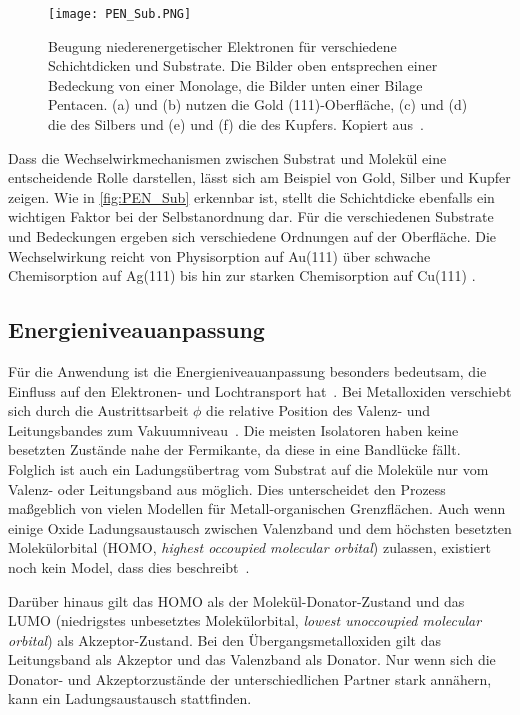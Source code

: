             \begin{figure}
                \centering
                \texttt{[image: PEN\_Sub.PNG]}
                \caption{Beugung niederenergetischer Elektronen für verschiedene Schichtdicken und Substrate.
                Die Bilder oben entsprechen einer Bedeckung von einer Monolage, die Bilder unten einer Bilage Pentacen.
                (a) und (b) nutzen die Gold (111)-Oberfläche, (c) und (d) die des Silbers und (e) und (f) die des Kupfers.
                Kopiert aus~\cite{5A_4}.}
                \label{fig:PEN_Sub}
            \end{figure}
            Dass die Wechselwirkmechanismen zwischen Substrat und Molekül eine entscheidende Rolle darstellen, lässt sich am Beispiel von Gold, Silber und Kupfer zeigen.
            Wie in \autoref{fig:PEN_Sub} erkennbar ist, stellt die Schichtdicke ebenfalls ein wichtigen Faktor bei der Selbstanordnung dar.
            Für die verschiedenen Substrate und Bedeckungen ergeben sich verschiedene Ordnungen auf der Oberfläche.
            Die Wechselwirkung reicht von Physisorption auf Au(111) über schwache Chemisorption auf Ag(111) bis hin zur starken Chemisorption auf Cu(111) \cite{5A_4}.

        \subsection{Energieniveauanpassung} \label{sec:ENA}
            Für die Anwendung ist die Energieniveauanpassung besonders bedeutsam, die Einfluss auf den Elektronen- und Lochtransport hat~\cite{IF_4}.
            Bei Metalloxiden verschiebt sich durch die Austrittsarbeit $\phi$ die relative Position des Valenz- und Leitungsbandes zum Vakuumniveau~\cite{IF_3}.
            Die meisten Isolatoren haben keine besetzten Zustände nahe der Fermikante, da diese in eine Bandlücke fällt.
            Folglich ist auch ein Ladungsübertrag vom Substrat auf die Moleküle nur vom Valenz- oder Leitungsband aus möglich.
            Dies unterscheidet den Prozess maßgeblich von vielen Modellen für Metall-organischen Grenzflächen.
            Auch wenn einige Oxide Ladungsaustausch zwischen Valenzband und dem höchsten besetzten Molekülorbital (HOMO, \textit{highest occoupied molecular orbital}) zulassen, existiert noch kein Model, dass dies beschreibt~\cite{IF_3}.

            Darüber hinaus gilt das HOMO als der Molekül-Donator-Zustand und das LUMO (niedrigstes unbesetztes Molekülorbital, \textit{lowest unoccoupied molecular orbital}) als Akzeptor-Zustand.
            Bei den Übergangsmetalloxiden gilt das Leitungsband als Akzeptor und das Valenzband als Donator. 
            Nur wenn sich die Donator- und Akzeptorzustände der unterschiedlichen Partner stark annähern, kann ein Ladungsaustausch stattfinden.

